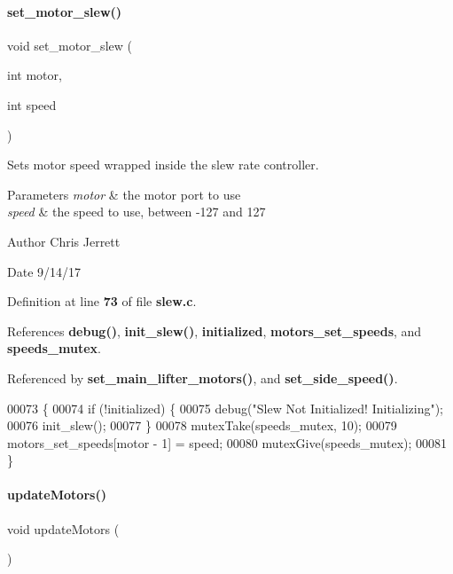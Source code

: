 \paragraph{set\+\_\+motor\+\_\+slew()}
{\footnotesize\ttfamily void set\+\_\+motor\+\_\+slew (\begin{DoxyParamCaption}\item[{int}]{motor,  }\item[{int}]{speed }\end{DoxyParamCaption})}



Sets motor speed wrapped inside the slew rate controller. 


\begin{DoxyParams}{Parameters}
{\em motor} & the motor port to use \\
\hline
{\em speed} & the speed to use, between -\/127 and 127 \\
\hline
\end{DoxyParams}
\begin{DoxyAuthor}{Author}
Chris Jerrett 
\end{DoxyAuthor}
\begin{DoxyDate}{Date}
9/14/17 
\end{DoxyDate}


Definition at line \textbf{ 73} of file \textbf{ slew.\+c}.



References \textbf{ debug()}, \textbf{ init\+\_\+slew()}, \textbf{ initialized}, \textbf{ motors\+\_\+set\+\_\+speeds}, and \textbf{ speeds\+\_\+mutex}.



Referenced by \textbf{ set\+\_\+main\+\_\+lifter\+\_\+motors()}, and \textbf{ set\+\_\+side\+\_\+speed()}.


\begin{DoxyCode}
00073                                           \{
00074   \textcolor{keywordflow}{if} (!initialized) \{
00075     debug(\textcolor{stringliteral}{"Slew Not Initialized! Initializing"});
00076     init_slew();
00077   \}
00078   mutexTake(speeds_mutex, 10);
00079   motors_set_speeds[motor - 1] = speed;
00080   mutexGive(speeds_mutex);
00081 \}
\end{DoxyCode}
\mbox{\label{a00065_a807a87c5df438fde21c1e8213906695b}} 
\paragraph{update\+Motors()}
{\footnotesize\ttfamily void update\+Motors (\begin{DoxyParamCaption}{ }\end{DoxyParamCaption})}



